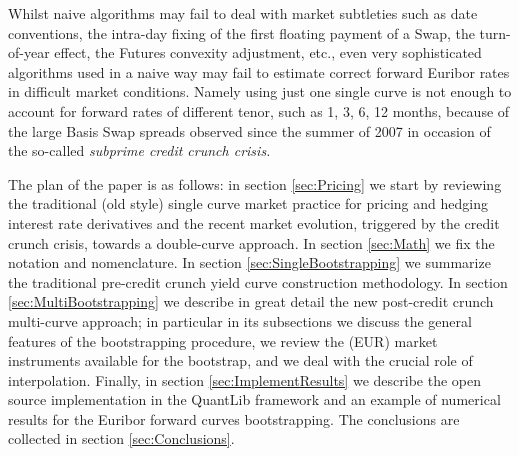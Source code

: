 \documentclass[11pt,reqno]{amsart}
\begin{document}
\par
Whilst naive algorithms may fail to deal with market subtleties such as date conventions, the intra-day fixing of the first floating payment of a Swap, the turn-of-year effect, the Futures convexity adjustment, etc., even very sophisticated algorithms used in a naive way may fail to estimate correct forward Euribor rates in difficult market conditions. Namely using just one single curve is not enough to account for forward rates of different tenor, such as 1, 3, 6, 12 months, because of the large Basis Swap spreads observed since the summer of 2007 in occasion of the so-called {\it subprime credit crunch crisis.}
\par
The plan of the paper is as follows:
in section \ref{sec:Pricing} we start by reviewing the traditional (old style) single curve market practice for pricing and hedging interest rate derivatives and the recent market evolution, triggered by the credit crunch crisis, towards a double-curve approach.
In section \ref{sec:Math} we fix the notation and nomenclature.
In section \ref{sec:SingleBootstrapping} we summarize the traditional pre-credit crunch yield curve construction methodology.
In section \ref{sec:MultiBootstrapping} we describe in great detail the new post-credit crunch multi-curve approach; in particular in its subsections we discuss the general features of the bootstrapping procedure, we review the (EUR) market instruments available for the bootstrap, and we deal with the crucial role of interpolation.
Finally, in section \ref{sec:ImplementResults} we describe the open source implementation in the QuantLib framework and an example of numerical results for the Euribor forward curves bootstrapping.
The conclusions are collected in section \ref{sec:Conclusions}.
\end{document}
